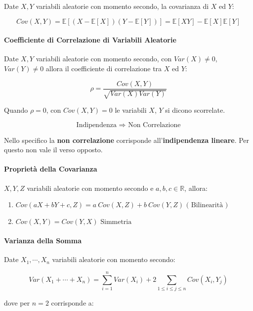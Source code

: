 \documentclass{article}
\begin{document}
Date $X,Y$ variabili aleatorie con momento secondo, la covarianza di $X$ ed $Y$:

\[ Cov(X,Y) = \mathbb{E}[(X - \mathbb{E}[X])(Y - \mathbb{E}[Y])] = \mathbb{E}[XY] - \mathbb{E}[X] \mathbb{E}[Y]  \]

\paragraph{Coefficiente di Correlazione di Variabili Aleatorie}

Date $X,Y$ variabili aleatorie con momento secondo, con $Var(X) \neq 0$, $Var(Y) \neq 0$ allora il coefficiente di correlazione tra $X$ ed $Y$:

\[ \rho = \frac{Cov(X,Y)}{\sqrt{Var(X) Var(Y) }} \]

Quando $\rho = 0$, con $ Cov(X,Y) = 0$ le variabili $X$, $Y$ si dicono scorrelate.

\[ \text{Indipendenza } \Rightarrow \text{ Non Correlazione} \]

Nello specifico la \textbf{non correlazione} corrisponde all'\textbf{indipendenza lineare}. Per questo non vale il verso opposto.

\paragraph{Proprietà della Covarianza} $X,Y,Z$ variabili aleatorie con momento secondo e $a,b,c \in \mathbb{R}$, allora:

\begin{enumerate}
    \item $Cov(aX + bY + c, Z) = a\:Cov(X,Z) + b\:Cov(Y,Z) \text{ ( Bilinearità ) } $
    \item $ Cov(X,Y) = Cov(Y,X) \text{ Simmetria } $
\end{enumerate}

\paragraph{Varianza della Somma} Date $X_{1}, \cdots, X_{n}$ variabili aleatorie con momento secondo:

\[ Var(X_{1} + \cdots + X_{n}) = \sum_{i=1}^{n} Var(X_{i}) + 2 \sum_{1 \leq i \leq j \leq n} Cov(X_{i}, Y_{j}) \]

\begin{center}
    dove per $n = 2$ corrisponde a:
\end{center}

\vspace*{-10px}
\end{document}
